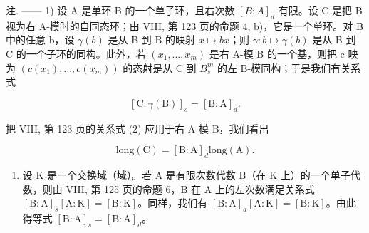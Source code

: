 注. —— 1) 设 A 是单环 B 的一个单子环，且右次数 \([B : A]_{d}\) 有限。设 C 是把 B 视为右 A-模时的自同态环；由 VIII, 第 123 页的命题 4, b)，它是一个单环。对 B 中的任意 b，设 \(\gamma(b)\) 是从 B 到 B 的映射 \(x \mapsto bx\)；则 \(\gamma : b \mapsto \gamma(b)\) 是从 B 到 C 的一个子环的同构。此外，若 \((x_{1}, \ldots, x_{m})\) 是右 A-模 B 的一个基，则把 c 映为 \((c(x_{1}), \ldots, c(x_{m}))\) 的态射是从 C 到 \(B_{s}^{m}\) 的左 B-模同构；于是我们有关系式

\[
[ \mathrm{C}: \gamma (\mathrm{B}) ] _ {s} = [ \mathrm{B}: \mathrm{A} ] _ {d}.\tag{4}
\]

把 VIII, 第 123 页的关系式 (2) 应用于右 A-模 B，我们看出

\[
\mathrm{long} (\mathrm{C}) = [ \mathrm{B}: \mathrm{A} ] _ {d} \mathrm{long} (\mathrm{A}).\tag{5}
\]

\begin{enumerate}
\def\labelenumi{\arabic{enumi})}
\setcounter{enumi}{1}
\tightlist
\item
  设 \(\mathrm{K}\) 是一个交换域（域）。若 \(\mathrm{A}\) 是有限次数代数 \(\mathrm{B}\)（在 \(\mathrm{K}\) 上）的一个单子代数，则由 VIII, 第 125 页的命题 6，\(\mathrm{B}\) 在 \(\mathrm{A}\) 上的左次数满足关系式 \(\left[\mathrm{B}:\mathrm{A}\right]_s[\mathrm{A}:\mathrm{K}] = [\mathrm{B}:\mathrm{K}]\)。同样，我们有 \(\left[\mathrm{B}:\mathrm{A}\right]_d[\mathrm{A}:\mathrm{K}] = [\mathrm{B}:\mathrm{K}]\)。由此得等式 \(\left[\mathrm{B}:\mathrm{A}\right]_s = \left[\mathrm{B}:\mathrm{A}\right]_d\)。
\end{enumerate}

